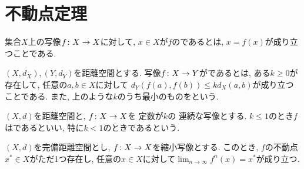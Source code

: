 \documentclass[uplatex, dvipdfmx, a4paper, 12pt, class=jsbook, crop=false]{standalone}
\begin{document}
\section{不動点定理}
\label{sec:empty-template}

\begin{definition}
	集合$ X $上の写像$ f\colon X\to X $に対して,
	$ x \in X $が$ f $のであるとは,
	$ x = f(x) $が成り立つことである.
\end{definition}

\begin{definition}
	$ (X, d_X), (Y, d_Y) $を距離空間とする.
	写像$ f\colon X\to Y $がであるとは,
	ある$ k \geq 0 $が存在して, 任意の$ a, b \in X $に対して
	$ d_Y(f(a), f(b)) \leq kd_X(a, b) $が成り立つことである.
	また, 上のような$ k $のうち最小のものをという.
\end{definition}

\begin{definition}
	$ (X, d) $を距離空間と, $ f\colon X\to X $を \Lipschitz 定数が$ k $の \Lipschitz 連続な写像とする.
	$ k \leq 1 $のとき$ f $はであるといい,
	特に$ k < 1 $のときであるという.
\end{definition}

\begin{theorem}
	$ (X, d) $を完備距離空間とし, $ f\colon X\to X $を縮小写像とする.
	このとき, $ f $の不動点$ x^* \in X $がただ1つ存在し,
	任意の$ x \in X $に対して$ \lim_{n \to \infty} f^n(x) = x^* $が成り立つ.
\end{theorem}
\end{document}
